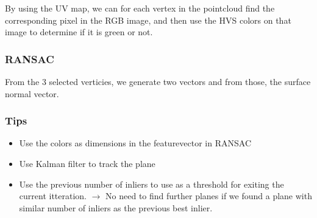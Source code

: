 \documentclass[a4paper]{article}
\begin{document}
By using the UV map, we can for each vertex in the pointcloud find the corresponding pixel in the RGB image, and then use the HVS colors on that image to determine if it is green or not. 


\subsubsection*{RANSAC}
From the 3 selected verticies, we generate two vectors and from those, the surface normal vector. 

\subsubsection{Tips}
\begin{itemize}
	\item Use the colors as dimensions in the featurevector in RANSAC
	\item Use Kalman filter to track the plane
	\item Use the previous number of inliers to use as a threshold for exiting the current itteration. $ \rightarrow $ No need to find further planes if we found a plane with similar number of inliers as the previous best inlier. 
\end{itemize}
\end{document}
